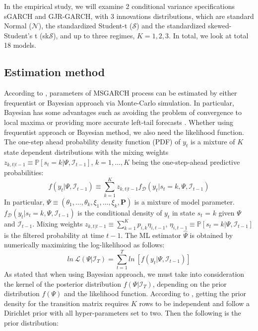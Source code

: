 \documentclass[12pt,a4paper]{article}
\begin{document}
In the empirical study, we will examine 2 conditional variance specifications sGARCH and GJR-GARCH, with 3 innovations distributions, which are standard Normal ($\mathcal{N}$), the standardized Student-t ($\mathcal{S}$) and the standardized skewed-Student's t (sk$\mathcal{S}$), and up to three regimes, $K = 1,2,3$. In total, we look at total 18 models. \par

\subsection{Estimation method}
According to \cite{haas2004new}, parameters of MSGARCH process can be estimated by either frequentist or Bayesian approach via Monte-Carlo simulation. In particular, Bayesian has some advantages such as avoiding the problem of convergence to local maxima or providing more accurate left-tail forecasts	 \cite{ardia2018forecasting}. Whether using frequentist approach or Bayesian method, we also need the likelihood function. The one-step ahead probability density function (PDF) of $y_t$ is a mixture of $K$ state dependent distributions with the mixing weights $z_{k,t \vert t-1} \equiv \mathbb{P}[s_t = k \vert \Psi, \mathcal{I}_{t-1}]$, $k = 1, \ldots, K$ being the one-step-ahead predictive probabilities:
\begin{equation}
	f(y_t \vert \Psi, \mathcal{I}_{t-1}) \equiv \sum^K_{k = 1} z_{k,t \vert t-1} f_\mathcal{D} (y_t \vert s_t = k, \Psi, \mathcal{I}_{t-1})
\end{equation}
In particular, $\Psi \equiv (\theta_1, \ldots, \theta_k, \xi_1, \ldots, \xi_k, \mathbf{P})$ is a mixture of model parameter. $f_\mathcal{D}(y_t \vert s_t = k, \Psi, \mathcal{I}_{t-1})$ is the conditional density of $y_t$ in state $s_t$ = $k$ given $\Psi$ and $\mathcal{I}_{t-1}$. Mixing weights $z_{k,t \vert t-1} \equiv \sum^K_{k = 1} p_{i,k} \eta_{i,t-1}$, $\eta_{i,t-1} \equiv \mathbb{P}[s_t = k \vert \Psi,\mathcal{I}_{t-1}]$ is the filtered probability at time $t-1$. The ML estimator $\hat{\Psi}$ is obtained by numerically maximizing the log-likelihood as follows:
\begin{equation}
	ln\: \mathcal{L}(\Psi \vert \mathcal{I}_T) = \sum^T_{t=1} ln\:[f(y_t \vert \Psi, \mathcal{I}_{t-1})]
\end{equation}
As \cite{ardia2018forecasting} stated that when using Bayesian approach, we must take into consideration the kernel of the posterior distribution $f(\Psi \vert \mathcal{I}_T)$, depending on the prior distribution $f(\Psi)$ and the likelihood function. According to \cite{trottier2016moments}, getting the prior density for the transition matrix requires $K$ rows to be independent and follow a Dirichlet prior with all hyper-parameters set to two. Then the following is the prior distribution:
\end{document}
